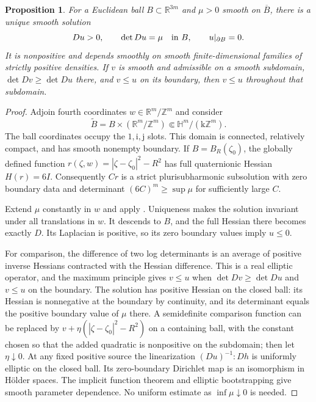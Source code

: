\documentclass[11pt]{article}
\newtheorem{proposition}{Proposition}
\numberwithin{equation}{section}
\newcommand{\R}{\mathbb R}
\newcommand{\HH}{\mathbb H}
\begin{document}
\begin{proposition}\label{prop:dirichlet}
For a Euclidean ball $B\subset\R^{3m}$ and $\mu>0$ smooth on
$\overline B$, there is a unique smooth solution
\[
 Du>0,\qquad\det Du=\mu\quad\hbox{in }B,
 \qquad u|_{\partial B}=0.
\]
It is nonpositive and depends smoothly on smooth finite-dimensional
families of strictly positive densities. If $v$ is smooth and
admissible on a smooth subdomain, $\det Dv\ge\det Du$ there, and
$v\le u$ on its boundary, then $v\le u$ throughout that subdomain.
\end{proposition}
\begin{proof}
Adjoin fourth coordinates $w\in\R^m/\mathbb Z^m$ and consider
\[
 \widetilde B=B\times(\R^m/\mathbb Z^m)
 \Subset\HH^m/(\mathrm{k}\mathbb Z^m).
\]
The ball coordinates occupy the $1,\mathrm{i},\mathrm{j}$ slots.
This domain is connected, relatively compact, and has smooth nonempty
boundary. If $B=B_R(\zeta_0)$, the globally defined function
$r(\zeta,w)=|\zeta-\zeta_0|^2-R^2$ has full quaternionic Hessian
$H(r)=6I$. Consequently $Cr$ is a strict plurisubharmonic subsolution
with zero boundary data and determinant $(6C)^m\ge\sup\mu$ for
sufficiently large $C$.

Extend $\mu$ constantly in $w$ and apply \cite[Theorem 1.1]{MZ}.
Uniqueness makes the solution invariant under all translations in $w$.
It descends to $B$, and the full Hessian there becomes exactly $D$.
Its Laplacian is positive, so its zero boundary values imply $u\le0$.

For comparison, the difference of two log determinants is an average
of positive inverse Hessians contracted with the Hessian difference.
This is a real elliptic operator, and the maximum principle gives
$v\le u$ when $\det Dv\ge\det Du$ and $v\le u$ on the boundary.
The solution has positive Hessian on the closed ball: its Hessian
is nonnegative at the boundary by continuity, and its determinant
equals the positive boundary value of $\mu$ there. A semidefinite
comparison function can be replaced by
$v+\eta(|\zeta-\zeta_0|^2-R^2)$ on a containing ball, with the
constant chosen so that the added quadratic is nonpositive on the
subdomain; then let $\eta\downarrow0$.
At any fixed positive source the linearization
$(Du)^{-1}:Dh$ is uniformly elliptic on the closed ball. Its zero-boundary
Dirichlet map is an isomorphism in H\"older spaces. The implicit
function theorem and elliptic bootstrapping give smooth parameter
dependence. No uniform estimate as $\inf\mu\downarrow0$ is needed.
\end{proof}
\end{document}
